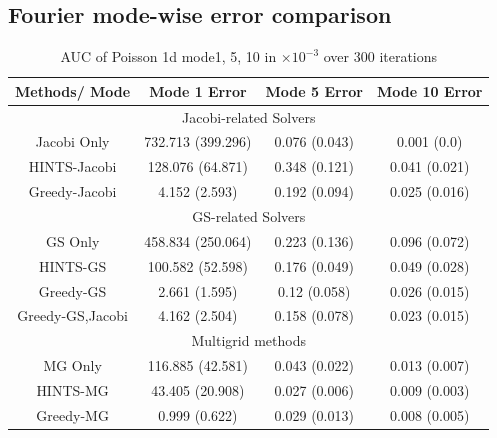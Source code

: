 \documentclass{article} %
\begin{document}
\subsection{Fourier mode-wise error comparison} \label{sec:fouriermodeerrorcomparison}


\begin{table}[]
    \centering
    \begin{tabular}{|c|c|c|c|}
        \hline
         Methods/ Mode & Mode 1 Error & Mode 5 Error & Mode 10 Error\\
         \hline
         \multicolumn{4}{|c|}{Jacobi-related Solvers} \\
        \hline
        Jacobi Only & 732.713 (399.296) & 0.076 (0.043) & 0.001 (0.0) \\
        HINTS-Jacobi & 128.076 (64.871) & 0.348 (0.121) & 0.041 (0.021) \\
        Greedy-Jacobi & 4.152 (2.593) & 0.192 (0.094) & 0.025 (0.016) \\
        \hline
        \multicolumn{4}{|c|}{GS-related Solvers} \\
        \hline
        GS Only & 458.834 (250.064) & 0.223 (0.136) & 0.096 (0.072) \\
        HINTS-GS & 100.582 (52.598) & 0.176 (0.049) & 0.049 (0.028) \\
        Greedy-GS & 2.661 (1.595) & 0.12 (0.058) & 0.026 (0.015) \\
        Greedy-GS,Jacobi & 4.162 (2.504) & 0.158 (0.078) & 0.023 (0.015) \\
         \hline
         \multicolumn{4}{|c|}{Multigrid methods} \\
         \hline
        MG Only & 116.885 (42.581) & 0.043 (0.022) & 0.013 (0.007) \\
        HINTS-MG & 43.405 (20.908) & 0.027 (0.006) & 0.009 (0.003) \\
        Greedy-MG & 0.999 (0.622) & 0.029 (0.013) & 0.008 (0.005) \\
         \hline
    \end{tabular}
    \caption{AUC of Poisson 1d mode1, 5, 10 in $\times 10^{-3}$ over 300 iterations}
    \label{tab:residualcomparison}
\end{table}

         
\end{document}
